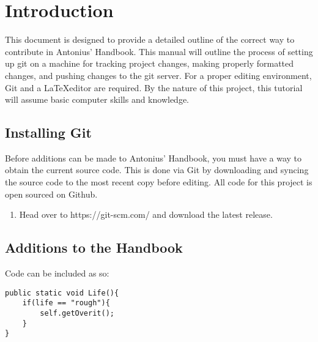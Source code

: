 \chapter{Introduction}

This document is designed to provide a detailed outline of the correct way to contribute in Antonius' Handbook. This manual will outline the process of setting up git on a machine for tracking project changes, making properly formatted changes, and pushing changes to the git server. For a proper editing environment, Git and a \LaTeX editor are required. By the nature of this project, this tutorial will assume basic computer skills and knowledge.


\section{Installing Git}

Before additions can be made to Antonius' Handbook, you must have a way to obtain the current source code. This is done via Git by downloading and syncing the source code to the most recent copy before editing. All code for this project is open sourced on Github.

\begin{enumerate}
	\item Head over to https://git-scm.com/ and download the latest release.
\end{enumerate}


\section{Additions to the Handbook}

Code can be included as so:

\begin{lstlisting}
public static void Life(){
	if(life == "rough"){
		self.getOverit();
	}
}
\end{lstlisting}